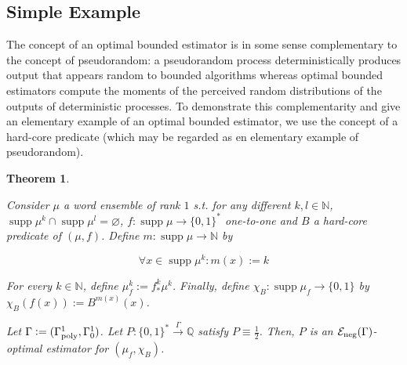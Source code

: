 \documentclass{article}
\numberwithin{equation}{section}
\theoremstyle{definition}
\theoremstyle{plain}
\newtheorem{theorem}{Theorem}[section]
\newcommand{\Bool}{\{0,1\}}
\newcommand{\Words}{{\Bool^*}}
\DeclareMathOperator{\Supp}{supp}
\newcommand{\Nats}{\mathbb{N}}
\newcommand{\Rats}{\mathbb{Q}}
\newcommand{\Fall}{\mathcal{E}}
\newcommand{\GammaPoly}{\Gamma_{\textnormal{poly}}}
\newcommand{\Scheme}{\xrightarrow{\Gamma}}
\begin{document}
\subsection{Simple Example}
\label{sec:fundamentals__one_way}

The concept of an optimal bounded estimator is in some sense complementary to the concept of pseudorandom: a pseudorandom process deterministically produces output that appears random to bounded algorithms whereas optimal bounded estimators compute the moments of the perceived random distributions of the outputs of deterministic processes. To demonstrate this complementarity and give an elementary example of an optimal bounded estimator, we use the concept of a hard-core predicate (which may be regarded as en elementary example of pseudorandom).

\begin{theorem}
\label{thm:hard_core}

Consider $\mu$ a word ensemble of rank ${1}$ s.t. for any different $k,l \in \Nats$, ${\Supp \mu^k \cap \Supp \mu^l = \varnothing}$, ${f: \Supp \mu \rightarrow \Words}$ one-to-one and $B$ a hard-core predicate of $(\mu,f)$. Define ${m: \Supp \mu \rightarrow \Nats}$ by 

\[\forall x \in \Supp \mu^k: m(x):=k\]

For every $k \in \Nats$, define ${\mu_f^k:=f_*^k\mu^k}$.  Finally, define ${\chi_B: \Supp \mu_f \rightarrow \Bool}$ by ${\chi_B(f(x)):=B^{m(x)}(x)}$.

Let $\Gamma:=(\GammaPoly^1,\Gamma_0^1)$. Let $P: \Words \Scheme \Rats$ satisfy $P \equiv \frac{1}{2}$. Then, $P$ is an $\Fall_{\textnormal{neg}}(\Gamma)$-optimal estimator for $(\mu_f, \chi_B)$.

\end{theorem}
\end{document}
